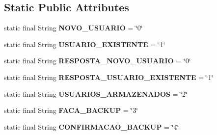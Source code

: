 \subsection*{Static Public Attributes}
\begin{DoxyCompactItemize}
\item 
\hypertarget{classutils_1_1_painel_de_controle_a88703f1170699de77b65d7bf3b86a3af}{static final String {\bfseries N\+O\+V\+O\+\_\+\+U\+S\+U\+A\+R\+I\+O} = \char`\"{}0\char`\"{}}\label{classutils_1_1_painel_de_controle_a88703f1170699de77b65d7bf3b86a3af}

\item 
\hypertarget{classutils_1_1_painel_de_controle_af79850e9e7d0b6707408db6182a9d3e3}{static final String {\bfseries U\+S\+U\+A\+R\+I\+O\+\_\+\+E\+X\+I\+S\+T\+E\+N\+T\+E} = \char`\"{}1\char`\"{}}\label{classutils_1_1_painel_de_controle_af79850e9e7d0b6707408db6182a9d3e3}

\item 
\hypertarget{classutils_1_1_painel_de_controle_a236e6877addb2533817402f848bc62b1}{static final String {\bfseries R\+E\+S\+P\+O\+S\+T\+A\+\_\+\+N\+O\+V\+O\+\_\+\+U\+S\+U\+A\+R\+I\+O} = \char`\"{}0\char`\"{}}\label{classutils_1_1_painel_de_controle_a236e6877addb2533817402f848bc62b1}

\item 
\hypertarget{classutils_1_1_painel_de_controle_aeafcb421430f01fd9abbd136b3e018a1}{static final String {\bfseries R\+E\+S\+P\+O\+S\+T\+A\+\_\+\+U\+S\+U\+A\+R\+I\+O\+\_\+\+E\+X\+I\+S\+T\+E\+N\+T\+E} = \char`\"{}1\char`\"{}}\label{classutils_1_1_painel_de_controle_aeafcb421430f01fd9abbd136b3e018a1}

\item 
\hypertarget{classutils_1_1_painel_de_controle_aa512f07525d77909626f3d6132059f4a}{static final String {\bfseries U\+S\+U\+A\+R\+I\+O\+S\+\_\+\+A\+R\+M\+A\+Z\+E\+N\+A\+D\+O\+S} = \char`\"{}2\char`\"{}}\label{classutils_1_1_painel_de_controle_aa512f07525d77909626f3d6132059f4a}

\item 
\hypertarget{classutils_1_1_painel_de_controle_a2196531dd198eb96b00b2c7eb0fb2a07}{static final String {\bfseries F\+A\+C\+A\+\_\+\+B\+A\+C\+K\+U\+P} = \char`\"{}3\char`\"{}}\label{classutils_1_1_painel_de_controle_a2196531dd198eb96b00b2c7eb0fb2a07}

\item 
\hypertarget{classutils_1_1_painel_de_controle_ab8cdc71552bb14f4bf73b92f06bc7a7e}{static final String {\bfseries C\+O\+N\+F\+I\+R\+M\+A\+C\+A\+O\+\_\+\+B\+A\+C\+K\+U\+P} = \char`\"{}4\char`\"{}}\label{classutils_1_1_painel_de_controle_ab8cdc71552bb14f4bf73b92f06bc7a7e}


\end{DoxyCompactItemize}
